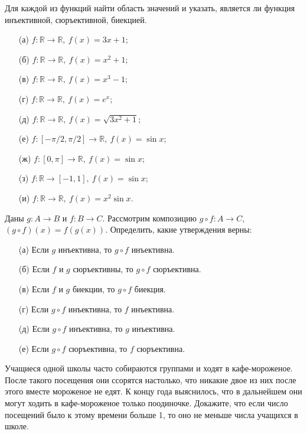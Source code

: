 \documentclass{article}
\begin{document}
\begin{task}[2]
Для каждой из функций найти область значений и указать, является ли функция инъективной, сюръективной, биекцией.
\begin{enumerate}
    \item[(а)] $f : \mathbb{R} \to \mathbb{R},\ f(x) = 3x + 1$;
    \item[(б)] $f : \mathbb{R} \to \mathbb{R},\ f(x) = x^2 + 1$;
    \item[(в)] $f : \mathbb{R} \to \mathbb{R},\ f(x) = x^3 - 1$;
    \item[(г)] $f : \mathbb{R} \to \mathbb{R},\ f(x) = e^x$;
    \item[(д)] $f : \mathbb{R} \to \mathbb{R},\ f(x) = \sqrt{3x^2 + 1}$;
    \item[(е)] $f : [-\pi/2, \pi/2] \to \mathbb{R},\ f(x) = \sin x$;
    \item[(ж)] $f : [0, \pi] \to \mathbb{R},\ f(x) = \sin x$;
    \item[(з)] $f : \mathbb{R} \to [-1, 1],\ f(x) = \sin x$;
    \item[(и)] $f : \mathbb{R} \to \mathbb{R},\ f(x) = x^2 \sin x$.
\end{enumerate}
\end{task}

\begin{task}[2]
Даны $g : A \to B$ и $f : B \to C$. Рассмотрим композицию $g\circ f : A \to C$, $(g\circ f)(x)=f(g(x))$. Определить, какие утверждения верны:
\begin{enumerate}
    \item[(а)] Если $g$ инъективна, то $g\circ f$ инъективна.
    \item[(б)] Если $f$ и $g$ сюръективны, то $g\circ f$ сюръективна.
    \item[(в)] Если $f$ и $g$ биекции, то $g\circ f$ биекция.
    \item[(г)] Если $g\circ f$ инъективна, то $f$ инъективна.
    \item[(д)] Если $g\circ f$ инъективна, то $g$ инъективна.
    \item[(е)] Если $g\circ f$ сюръективна, то $f$ сюръективна.
\end{enumerate}
\end{task}

\begin{task}[3]
Учащиеся одной школы часто собираются группами и ходят в кафе-мороженое. После такого посещения они ссорятся настолько, что никакие двое из них после этого вместе мороженое не едят. К концу года выяснилось, что в дальнейшем они могут ходить в кафе-мороженое только поодиночке. Докажите, что если число посещений было к этому времени больше 1, то оно не меньше числа учащихся в школе.
\end{task}
\end{document}
